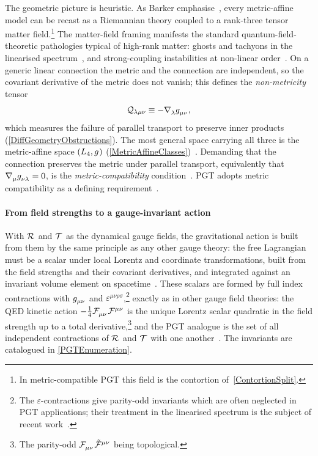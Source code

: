 The geometric picture is heuristic. As Barker \etal
emphasise~\cite{barker2024poincare,barker2025metricaffine}, every
metric-affine model can be recast as a Riemannian theory
coupled to a rank-three tensor matter field.\footnote{In
metric-compatible PGT this field is the contortion of~\cref{ContortionSplit}.}
The matter-field framing manifests
the standard quantum-field-theoretic pathologies typical of
high-rank matter: ghosts and tachyons in the linearised
spectrum~\cite{sezgin1980ghostfree,blagojevic2018hamiltonian,lin2019pgt},
and strong-coupling instabilities at non-linear
order~\cite{aoki2020nonlinear}.
On a generic linear connection the metric and the connection are
independent, so the covariant derivative of the metric does not
vanish; this defines the \emph{non-metricity}
tensor~\cite[eq.~(2.5)]{blagojevic2003lectures}
\begin{equation}
  \mathcal{Q}_{\lambda\mu\nu} \equiv -\rcD{_\lambda}\g{_{\mu\nu}},
  \label{NonMetricityDef}
\end{equation}
which measures the failure of parallel transport to preserve inner
products (\cref{DiffGeometryObstructions}). The
most general space carrying all three is the
metric-affine space $(L_4, \g{})$
(\cref{MetricAffineClasses})~\cite{hehl1995metric}. Demanding that
the connection preserves the metric under parallel transport,
equivalently that $\rcD{_\mu}\g{_{\nu\lambda}} = 0$, is the
\emph{metric-compatibility}
condition~\cite[eq.~(2.5)]{blagojevic2003lectures}. PGT adopts
metric compatibility as a defining
requirement~\cite{hehl1976spin,blagojevic2003lectures}.

\paragraph*{From field strengths to a gauge-invariant action}
With $\MAGF{}$ and $\MAGT{}$ as the dynamical gauge fields, the
gravitational action is built from them by the same principle as
any other gauge theory: the free Lagrangian must be a scalar
under local Lorentz and coordinate
transformations, built
from the field strengths and their covariant derivatives, and
integrated against an invariant volume element on
spacetime~\cite[eq.~(1.13)]{blagojevic2003lectures,lin2019pgt}.
These scalars are formed by full index contractions with
$\g{_{\mu\nu}}$ and $\varepsilon^{\mu\nu\rho\sigma}$,\footnote{The
$\varepsilon$-contractions give parity-odd invariants which are
often neglected in PGT applications; their treatment in the
linearised spectrum is the subject of recent
work~\cite{karananas2014parity,barker2025psalter2}.} exactly as
in other gauge field theories: the QED kinetic
action $-\tfrac{1}{4}\FieldF{_{\mu\nu}}\FieldF{^{\mu\nu}}$ is the
unique Lorentz scalar quadratic in the field strength up to a
total derivative,\footnote{The parity-odd
$\FieldF{_{\mu\nu}}\FieldFtilde{^{\mu\nu}}$ being topological.} and the
PGT analogue is the set of all independent contractions
of $\MAGF{}$ and $\MAGT{}$ with one
another~\cite{barker2024poincare,sezgin1980ghostfree,hehl1995metric}.
The invariants are catalogued in
\cref{PGTEnumeration}.

